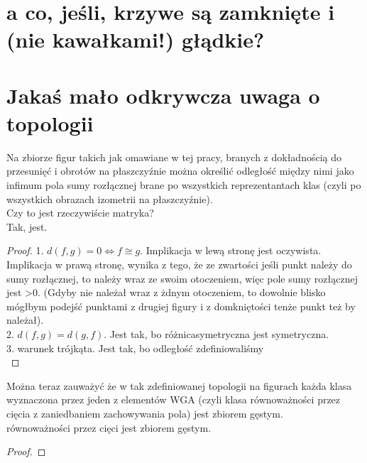 \documentclass[a4paper, 12pt]{article}
\begin{document}
\section{a co, jeśli, krzywe są zamknięte i (nie kawałkami!) głądkie?}

\section{Jakaś mało odkrywcza uwaga o topologii}
Na zbiorze figur takich jak omawiane w tej pracy, branych z dokładnością do przesunięć i obrotów na
płaszczyźnie można określić odległość między nimi jako infimum pola sumy rozłącznej brane po wszystkich
reprezentantach klas (czyli po wszystkich obrazach izometrii na płaszczyźnie). \\
Czy to jest rzeczywiście matryka? \\
Tak, jest. \\
\begin{proof}
    1. $d(f,g) = 0 \iff f \cong g$. Implikacja w lewą stronę jest oczywista. Implikacja w prawą stronę,
    wynika z tego, że ze zwartości jeśli punkt należy do sumy rozłącznej, to należy wraz ze swoim otoczeniem,
     więc pole sumy rozłącznej jest >0. (Gdyby nie należał wraz z żdnym otoczeniem, to dowolnie blisko
     mógłbym podejść punktami z drugiej figury i z domkniętości tenże punkt też by należał). \\
     2. $d(f,g ) = d(g,f)$. Jest tak, bo różnicasymetryczna jest symetryczna. \\
     3. warunek trójkąta. Jest tak, bo odległość zdefiniowaliśmy \\

\end{proof}
Można teraz zauważyć że w tak zdefiniowanej topologii na figurach każda klasa wyznaczona przez jeden z
elementów WGA (czyli klasa równoważności przez cięcia z zaniedbaniem zachowywania pola) jest zbiorem gęstym.
\\
równoważności przez cięci
jest zbiorem gęstym. \\
\begin{proof}

\end{proof}
\end{document}
